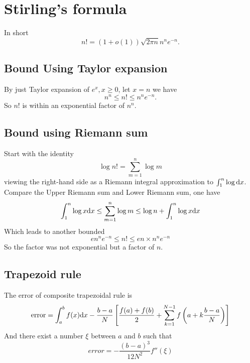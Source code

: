 \section{Stirling's formula}

In short
\begin{equation*}
    n! = (1+o(1))\sqrt{2\pi n }n^n e^{-n}.
\end{equation*}

\subsection{Bound Using Taylor expansion}

By just Taylor expansion of $e^x, x\geq0$, let $x=n$ we have
\begin{equation}
    n^n \leq n! \leq n^n e^{-n}.
\end{equation}
So $n!$ is within an exponential factor of $n^n$.

\subsection{Bound using Riemann sum}

Start with the identity
\begin{equation}
    \log n! = \sum_{m=1}^n \log m
\end{equation}
viewing the right-hand side as a Riemann integral approximation to $\int^n_1 \log \mathrm{d} x$. Compare the Upper Riemann sum and Lower Riemann sum, one have
\begin{equation}
    \int^n_1 \log x \mathrm{d} x \leq \sum_{m=1}^n \log m \leq \log n +\int^n_1 \log x \mathrm{d} x
\end{equation}
Which leads to another bounded
\begin{equation}
    en^n e^{-n} \leq n! \leq en \times n^n e^{-n}
\end{equation}
So the factor was not exponential but a factor of $n$.

\subsection{Trapezoid rule}

\begin{lemma}
    The error of composite trapezoidal rule is 
    \begin{equation*}
        \textrm{error} = \int_a^b f(x)\mathrm{d} x - \frac{b-a}{N} \left[\frac{f(a)+f(b)}{2} +\sum_{k=1}^{N-1}f \left(a+k\frac{b-a}{N}\right)\right] 
    \end{equation*}
    And there exist a number $\xi$ between $a$ and $b$ such that
    \begin{equation*}
        error = -\frac{(b-a)^3}{12N^2} f''(\xi)
    \end{equation*} 
\end{lemma}

